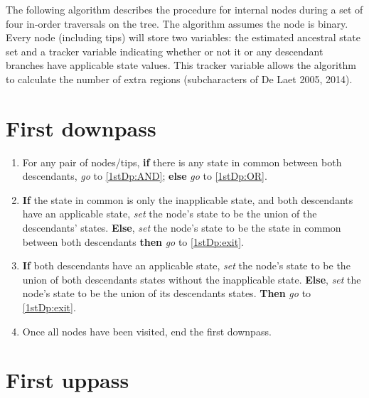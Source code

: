 \documentclass[a4paper,12pt]{article}
\begin{document}

\noindent The following algorithm describes the procedure for internal nodes during a set of four in-order traversals on the tree. The algorithm assumes the node is binary. Every node (including tips) will store two variables: the estimated ancestral state set and a tracker variable indicating whether or not it or any descendant branches have applicable state values. This tracker variable allows the algorithm to calculate the number of extra regions (subcharacters of De Laet 2005, 2014).

\section{First downpass} \label{1stDp}

\begin{enumerate}
    \item \label{1stDp:enter} For any pair of nodes/tips, \textbf{if} there is any state in common between both descendants, \textit{go} to \ref{1stDp:AND}; \textbf{else} \textit{go} to \ref{1stDp:OR}.
    \item \label{1stDp:AND} \textbf{If} the state in common is only the inapplicable state, and both descendants have an applicable state, \textit{set} the node's state to be the union of the descendants' states. \textbf{Else}, \textit{set} the node's state to be the state in common between both descendants \textbf{then} \textit{go} to \ref{1stDp:exit}.
    \item \label{1stDp:OR}  \textbf{If} both descendants have an applicable state, \textit{set} the node's state to be the union of both descendants states without the inapplicable state. \textbf{Else}, \textit{set} the node's state to be the union of its descendants states. \textbf{Then} \textit{go} to \ref{1stDp:exit}.
    \item \label{1stDp:exit} Once all nodes have been visited, end the first downpass.
\end{enumerate}


\section{First uppass} \label{1stUp}
\end{document}
